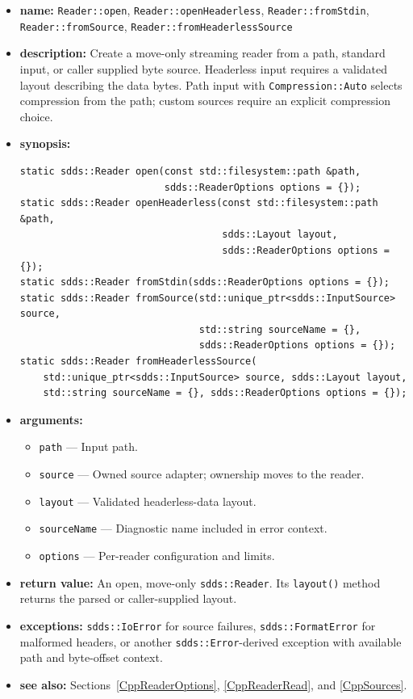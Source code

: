 \documentclass[11pt]{article}
\begin{document}
\begin{itemize}
\item {\bf name:}\newline
{\tt Reader::open}, {\tt Reader::openHeaderless}, {\tt Reader::fromStdin},
{\tt Reader::fromSource}, {\tt Reader::fromHeaderlessSource}
\item {\bf description:}\newline
Create a move-only streaming reader from a path, standard input, or caller
supplied byte source.  Headerless input requires a validated layout describing
the data bytes.  Path input with {\tt Compression::Auto} selects compression
from the path; custom sources require an explicit compression choice.
\item {\bf synopsis:}
\begin{verbatim}
static sdds::Reader open(const std::filesystem::path &path,
                         sdds::ReaderOptions options = {});
static sdds::Reader openHeaderless(const std::filesystem::path &path,
                                   sdds::Layout layout,
                                   sdds::ReaderOptions options = {});
static sdds::Reader fromStdin(sdds::ReaderOptions options = {});
static sdds::Reader fromSource(std::unique_ptr<sdds::InputSource> source,
                               std::string sourceName = {},
                               sdds::ReaderOptions options = {});
static sdds::Reader fromHeaderlessSource(
    std::unique_ptr<sdds::InputSource> source, sdds::Layout layout,
    std::string sourceName = {}, sdds::ReaderOptions options = {});
\end{verbatim}
\item {\bf arguments:}
\begin{itemize}
\item {\tt path} --- Input path.
\item {\tt source} --- Owned source adapter; ownership moves to the reader.
\item {\tt layout} --- Validated headerless-data layout.
\item {\tt sourceName} --- Diagnostic name included in error context.
\item {\tt options} --- Per-reader configuration and limits.
\end{itemize}
\item {\bf return value:}\newline
An open, move-only {\tt sdds::Reader}.  Its {\tt layout()} method returns the
parsed or caller-supplied layout.
\item {\bf exceptions:}\newline
{\tt sdds::IoError} for source failures, {\tt sdds::FormatError} for malformed
headers, or another {\tt sdds::Error}-derived exception with available path and
byte-offset context.
\item {\bf see also:}\newline
Sections~\ref{CppReaderOptions}, \ref{CppReaderRead}, and \ref{CppSources}.
\end{itemize}
\end{document}

